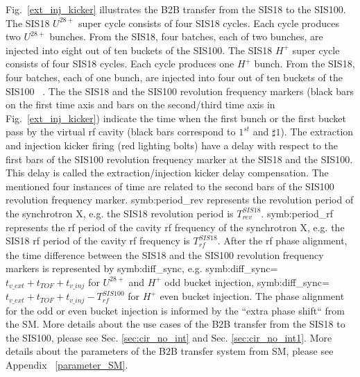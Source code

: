 Fig.~\ref{ext_inj_kicker} illustrates the B2B transfer from the SIS18 to the SIS100. The SIS18 $U^{28+}$ super cycle consists of four SIS18 cycles. Each cycle produces two $U^{28+}$ bunches. From the SIS18, four batches, each of two bunches, are injected into eight out of ten buckets of the SIS100. The SIS18 $H^{+}$ super cycle consists of four SIS18 cycles. Each cycle produces one $H^{+}$ bunch. From the SIS18, four batches, each of one bunch, are injected into four out of ten buckets of the SIS100 ~\cite{liebermann_fair_2013, liebermann_sis100_2013}. The the SIS18 and the SIS100 revolution frequency markers (black bars on the first time axis and bars on the second/third time axis in Fig.~\ref{ext_inj_kicker}) indicate the time when the first bunch or the first bucket pass by the virtual rf cavity (black bars correspond to $1^{st}$ and $\sharp1$). The extraction and injection kicker firing (red lighting bolts) have a delay with respect to the first bars of the SIS100 revolution frequency marker at the SIS18 and the SIS100. This delay is called the extraction/injection kicker delay compensation. The mentioned four instances of time are related to the second bars of the SIS100 revolution frequency marker. \gls{symb:period_rev} represents the revolution period of the synchrotron X, e.g. the SIS18 revolution period is $T_{\mathit{rev}}^{\mathit{SIS18}}$. \gls{symb:period_rf} represents the rf period of the cavity rf frequency of the synchrotron X, e.g. the SIS18 rf period of the cavity rf frequency is $T_{\mathit{rf}}^{\mathit{SIS18}}$. After the rf phase alignment, the time difference between the SIS18 and the SIS100 revolution frequency markers is represented by \gls{symb:diff_sync}, e.g. \gls{symb:diff_sync}=$t_{\mathit{v\_ext}}+t_{\mathit{TOF}}+t_{\mathit{v\_inj}}$ for $U^{28+}$ and $H^{+}$ odd bucket injection,  \gls{symb:diff_sync}=$t_{\mathit{v\_ext}}+t_{\mathit{TOF}}+t_{\mathit{v\_inj}}- T_{\mathit{rf}}^{\mathit{SIS100}}$ for $H^{+}$ even bucket injection. The phase alignment for the odd or even bucket injection is informed by the ``extra phase shift`` from the SM. More details about the use cases of the B2B transfer from the SIS18 to the SIS100, please see Sec. \ref{sec:cir_no_int} and Sec. \ref{sec:cir_no_int1}. More details about the parameters of the B2B transfer system from SM, please see Appendix ~\ref{parameter_SM}.  

